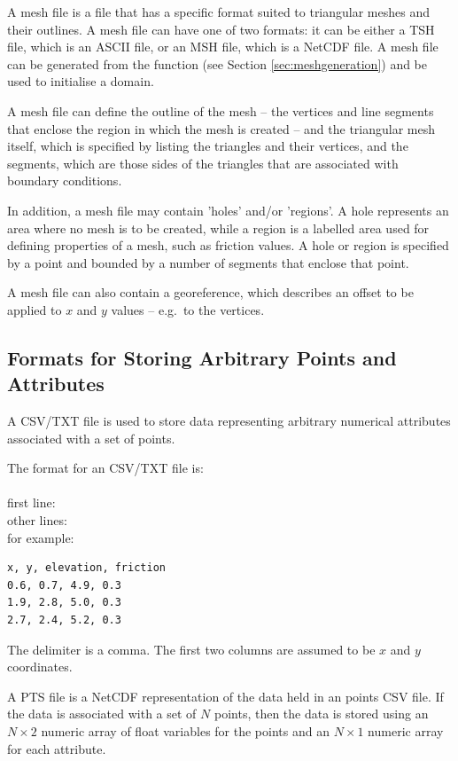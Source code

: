 \documentclass{manual}
\begin{document}
A mesh file is a file that has a specific format suited to
triangular meshes and their outlines. A mesh file can have one of
two formats: it can be either a TSH file, which is an ASCII file, or
an MSH file, which is a NetCDF file. A mesh file can be generated
from the function  (see
Section \ref{sec:meshgeneration}) and be used to initialise a domain.

A mesh file can define the outline of the mesh -- the vertices and
line segments that enclose the region in which the mesh is
created -- and the triangular mesh itself, which is specified by
listing the triangles and their vertices, and the segments, which
are those sides of the triangles that are associated with boundary
conditions.

In addition, a mesh file may contain 'holes' and/or 'regions'. A
hole represents an area where no mesh is to be created, while a
region is a labelled area used for defining properties of a mesh,
such as friction values.  A hole or region is specified by a point
and bounded by a number of segments that enclose that point.

A mesh file can also contain a georeference, which describes an
offset to be applied to $x$ and $y$ values -- e.g.\ to the vertices.

\subsection{Formats for Storing Arbitrary Points and Attributes}

A CSV/TXT file is used to store data representing
arbitrary numerical attributes associated with a set of points.

The format for an CSV/TXT file is:\\
 \\
first line:   \\
other lines:  \code{[x value], [y value], [attributes]}\\

for example:

\begin{verbatim}
x, y, elevation, friction
0.6, 0.7, 4.9, 0.3
1.9, 2.8, 5.0, 0.3
2.7, 2.4, 5.2, 0.3
\end{verbatim}

The delimiter is a comma. The first two columns are assumed to
be $x$ and $y$ coordinates.

A PTS file is a NetCDF representation of the data held in an points CSV
file. If the data is associated with a set of $N$ points, then the
data is stored using an $N \times 2$ numeric array of float
variables for the points and an $N \times 1$ numeric array for each
attribute.
\end{document}

